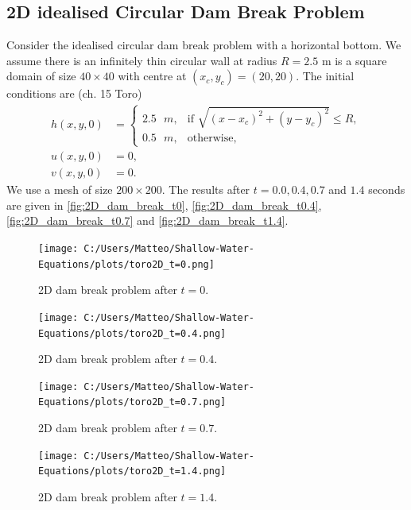 \subsection{2D idealised Circular Dam Break Problem}
Consider the idealised circular dam break problem with a horizontal bottom.
We assume there is an infinitely thin circular wall at radius $R = 2.5$ m is a square domain of size $40 \times 40 $ with centre at $(x_c,y_c) = (20, 20)$.
The initial conditions are (ch. 15 Toro)
\begin{align*}
    h(x,y,0) &= \begin{cases}
        2.5 \text{ }m, & \text{if } \sqrt{ {(x-x_c)}^2 + {(y-y_c)}^2 } \leq R, \\
        0.5 \text{ }m, & \text{otherwise},
    \end{cases} \\
    u(x,y,0) &= 0, \\
    v(x,y,0) &= 0.
\end{align*}
We use a mesh of size $200 \times 200$.
The results after $t=0.0, 0.4, 0.7$ and $1.4$ seconds are given in \autoref{fig:2D_dam_break_t0}, \autoref{fig:2D_dam_break_t0.4}, \autoref{fig:2D_dam_break_t0.7} and \autoref{fig:2D_dam_break_t1.4}.

\begin{figure}[H]
    \centering
    \texttt{[image: C:/Users/Matteo/Shallow-Water-Equations/plots/toro2D\_t=0.png]}
    \caption{2D dam break problem after $t=0$.}\label{fig:2D_dam_break_t0}
\end{figure}

\begin{figure}[H]
    \centering
    \texttt{[image: C:/Users/Matteo/Shallow-Water-Equations/plots/toro2D\_t=0.4.png]}
    \caption{2D dam break problem after $t=0.4$.}\label{fig:2D_dam_break_t0.4}
\end{figure}

\begin{figure}[H]
    \centering
    \texttt{[image: C:/Users/Matteo/Shallow-Water-Equations/plots/toro2D\_t=0.7.png]}
    \caption{2D dam break problem after $t=0.7$.}\label{fig:2D_dam_break_t0.7}
\end{figure}

\begin{figure}[H]
    \centering
    \texttt{[image: C:/Users/Matteo/Shallow-Water-Equations/plots/toro2D\_t=1.4.png]}
    \caption{2D dam break problem after $t=1.4$.}\label{fig:2D_dam_break_t1.4}
\end{figure}




